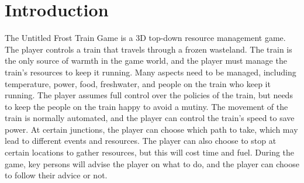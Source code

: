 \chapter{Introduction}\label{ch:introduction}

The Untitled Frost Train Game is a 3D top-down resource management game.
The player controls a train that travels through a frozen wasteland.
The train is the only source of warmth in the game world, and the player must manage the train's resources to keep it running.
Many aspects need to be managed, including temperature, power, food, freshwater, and people on the train who keep it running.
The player assumes full control over the policies of the train, but needs to keep the people on the train happy to avoid a mutiny.
The movement of the train is normally automated, and the player can control the train's speed to save power.
At certain junctions, the player can choose which path to take, which may lead to different events and resources.
The player can also choose to stop at certain locations to gather resources, but this will cost time and fuel.
During the game, key persons will advise the player on what to do, and the player can choose to follow their advice or not.
